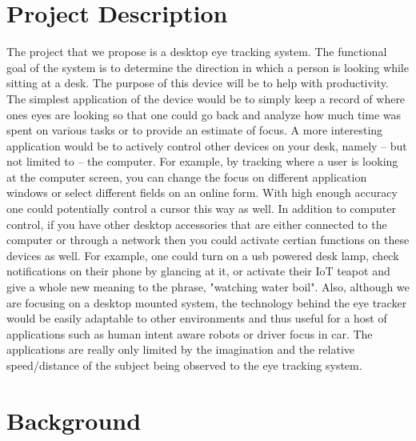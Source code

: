 \documentclass[12pt,conference,onecolumn]{IEEEtran}
\begin{document}
\section{Project Description} \label{sec:proj_desc}
The project that we propose is a desktop eye tracking system. The functional goal of the system is to determine the direction in which a person is looking while sitting at a desk. The purpose of this device will be to help with productivity. The simplest application of the device would be to simply keep a record of where ones eyes are looking so that one could go back and analyze how much time was spent on various tasks or to provide an estimate of focus. A more interesting application would be to actively control other devices on your desk, namely -- but not limited to -- the computer. For example, by tracking where a user is looking at the computer screen, you can change the focus on different application windows or select different fields on an online form. With high enough accuracy one could potentially control a cursor this way as well. In addition to computer control, if you have other desktop accessories that are either connected to the computer or through a network then you could activate certian functions on these devices as well. For example, one could turn on a usb powered desk lamp, check notifications on their phone by glancing at it, or activate their IoT teapot and give a whole new meaning to the phrase, "watching water boil". Also, although we are focusing on a desktop mounted system, the technology behind the eye tracker would be easily adaptable to other environments and thus useful for a host of applications such as human intent aware robots or driver focus in car. The applications are really only limited by the imagination and the relative speed/distance of the subject being observed to the eye tracking system.

\section{Background} \label{sec:background}
\end{document}
